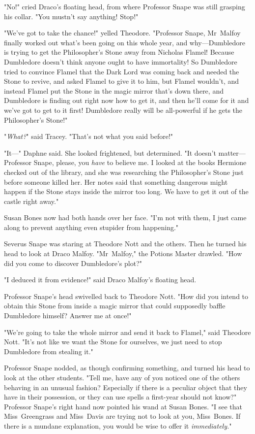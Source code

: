 "No!" cried Draco's floating head, from where Professor Snape was still
grasping his collar. "You mustn't say anything! Stop!"

"We've got to take the chance!" yelled Theodore. "Professor Snape, Mr~Malfoy
finally worked out what's been going on this whole year, and why—Dumbledore
is trying to get the Philosopher's Stone away from Nicholas Flamel! Because
Dumbledore doesn't think anyone ought to have immortality! So Dumbledore tried
to convince Flamel that the Dark Lord was coming back and needed the Stone to
revive, and asked Flamel to give it to him, but Flamel wouldn't, and instead
Flamel put the Stone in the magic mirror that's down there, and Dumbledore is
finding out right now how to get it, and then he'll come for it and we've got
to get to it first! Dumbledore really will be all-powerful if he gets the
Philosopher's Stone!"

"\emph{What?}" said Tracey. "That's not what you said before!"

"It—" Daphne said. She looked frightened, but determined. "It doesn't
matter—Professor Snape, please, you \emph{have} to believe me. I looked at
the books Hermione checked out of the library, and she was researching the
Philosopher's Stone just before someone killed her. Her notes said that
something dangerous might happen if the Stone stays inside the mirror too long.
We have to get it out of the castle right away."

Susan Bones now had both hands over her face. "I'm not with them, I just came
along to prevent anything even stupider from happening."

Severus Snape was staring at Theodore Nott and the others. Then he turned his
head to look at Draco Malfoy. "Mr~Malfoy," the Potions Master drawled. "How
did you come to discover Dumbledore's plot?"

"I deduced it from evidence!" said Draco Malfoy's floating head.

Professor Snape's head swivelled back to Theodore Nott. "How did you intend to
obtain this Stone from inside a magic mirror that could supposedly baffle
Dumbledore himself? Answer me at once!"

"We're going to take the whole mirror and send it back to Flamel," said
Theodore Nott. "It's not like we want the Stone for ourselves, we just need to
stop Dumbledore from stealing it."

Professor Snape nodded, as though confirming something, and turned his head to
look at the other students. "Tell me, have any of you noticed one of the others
behaving in an unusual fashion? Especially if there is a peculiar object that
they have in their possession, or they can use spells a first-year should not
know?" Professor Snape's right hand now pointed his wand at Susan Bones. "I see
that Miss~Greengrass and Miss~Davis are trying not to look at you, Miss~Bones.
If there is a mundane explanation, you would be wise to offer it
\emph{immediately.}"

